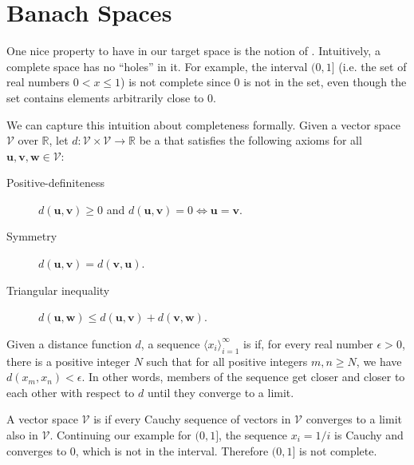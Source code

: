 \section{Banach Spaces}
One nice property to have in our target space is the notion of . Intuitively, a complete space has no ``holes'' in it. For example, the interval $(0, 1]$ (i.e. the set of real numbers $0 < x \leq 1$) is not complete since $0$ is not in the set, even though the set contains elements arbitrarily close to $0$.

We can capture this intuition about completeness formally. Given a vector space $\mathcal{V}$ over $\mathbb{R}$, let $d : \mathcal{V} \times \mathcal{V} \to \mathbb{R}$ be a  that satisfies the following axioms for all $\mathbf{u}, \mathbf{v}, \mathbf{w} \in \mathcal{V}$:
%
\begin{description}
  \item[Positive-definiteness] $d(\mathbf{u}, \mathbf{v}) \geq 0$ and $d(\mathbf{u}, \mathbf{v}) = 0 \Leftrightarrow \mathbf{u} = \mathbf{v}$.
  \item[Symmetry] $d(\mathbf{u}, \mathbf{v}) = d(\mathbf{v}, \mathbf{u})$.
  \item[Triangular inequality] $d(\mathbf{u}, \mathbf{w}) \leq d(\mathbf{u}, \mathbf{v}) + d(\mathbf{v}, \mathbf{w})$.
\end{description}
%
Given a distance function $d$, a sequence $\langle x_i \rangle_{i=1}^\infty$ is  if, for every real number $\epsilon > 0$, there is a positive integer $N$ such that for all positive integers $m, n \geq N$, we have $d(x_m, x_n) < \epsilon$. In other words, members of the sequence get closer and closer to each other with respect to $d$ until they converge to a limit.

A vector space $\mathcal{V}$ is  if every Cauchy sequence of vectors in $\mathcal{V}$ converges to a limit also in $\mathcal{V}$. Continuing our example for $(0, 1]$, the sequence $x_i = 1 / i$ is Cauchy and converges to $0$, which is not in the interval. Therefore $(0, 1]$ is not complete.

